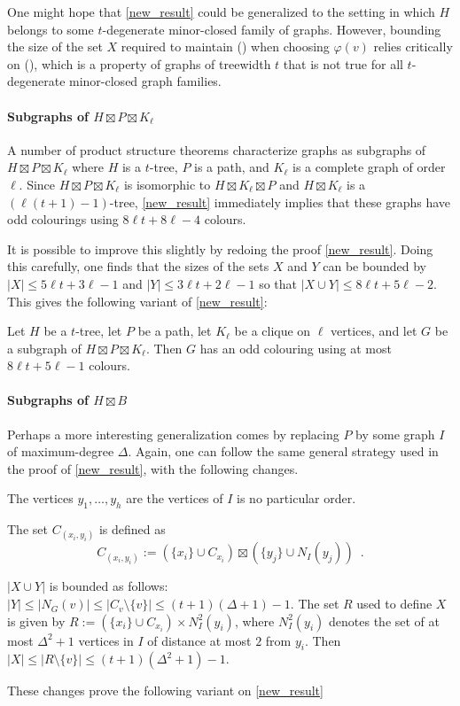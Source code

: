 \documentclass{patmorin}
\begin{document}
One might hope that \cref{new_result} could be generalized to the setting in which $H$ belongs to some $t$-degenerate minor-closed family of graphs.  However, bounding the size of the set $X$ required to maintain () when choosing $\varphi(v)$ relies critically on (), which is a property of graphs of treewidth $t$ that is not true for all $t$-degenerate minor-closed graph families.

\paragraph{Subgraphs of $H\boxtimes P\boxtimes K_\ell$}

A number of product structure theorems characterize graphs as subgraphs of $H\boxtimes P\boxtimes K_{\ell}$ where $H$ is a $t$-tree, $P$ is a path, and $K_\ell$ is a complete graph of order $\ell$.  Since $H\boxtimes P\boxtimes K_{\ell}$ is isomorphic to $H\boxtimes K_\ell\boxtimes P$ and $H\boxtimes K_\ell$ is a $(\ell(t+1)-1)$-tree, \cref{new_result} immediately implies that these graphs have odd colourings using $8\ell t+8\ell-4$ colours.

It is possible to improve this slightly by redoing the proof \cref{new_result}.  Doing this carefully, one finds that the sizes of the sets $X$ and $Y$ can be bounded by $|X|\le 5\ell t + 3\ell-1$ and $|Y|\le 3\ell t + 2\ell -1$ so that $|X\cup Y|\le 8\ell t + 5\ell -2$. This gives the following variant of \cref{new_result}:

\begin{thm}\label{new_result_kl}
  Let $H$ be a $t$-tree, let $P$ be a path, let $K_\ell$ be a clique on $\ell$ vertices, and let $G$ be a subgraph of $H\boxtimes P\boxtimes K_\ell$.  Then $G$ has an odd colouring using at most $8\ell t + 5\ell -1$ colours.
\end{thm}

\paragraph{Subgraphs of $H\boxtimes B$}

Perhaps a more interesting generalization comes by replacing $P$ by some graph $I$ of maximum-degree $\Delta$.  Again, one can follow the same general strategy used in the proof of \cref{new_result}, with the following changes.
\begin{compactitem}
  \item The vertices $y_1,\ldots,y_h$ are the vertices of $I$ is no particular order.
  \item The set $C_{(x_i,y_i)}$ is defined as
\[
    C_{(x_i,y_i)}:=(\{x_i\}\cup C_{x_i})\boxtimes (\{y_j\}\cup N_I(y_j)) \enspace .
\]
  \item $|X\cup Y|$ is bounded as follows: $|Y|\le|N_G(v)|\le |C_v\setminus\{v\}| \le (t+1)(\Delta+1)-1$.  The set $R$ used to define $X$ is given by $R:=(\{x_i\}\cup C_{x_i})\times N^2_I(y_i)$, where $N^2_I(y_i)$ denotes the set of at most $\Delta^2+1$ vertices in $I$ of distance at most $2$ from $y_i$.  Then $|X|\le|R\setminus\{v\}|\le (t+1)(\Delta^2+1)-1$.
\end{compactitem}
These changes prove the following variant on \cref{new_result}
\end{document}
